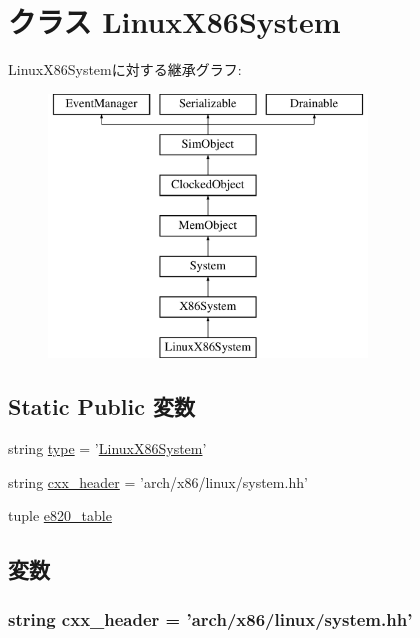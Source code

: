 \hypertarget{classX86System_1_1LinuxX86System}{
\section{クラス LinuxX86System}
\label{classX86System_1_1LinuxX86System}
}
LinuxX86Systemに対する継承グラフ:\begin{figure}[H]
\begin{center}
\leavevmode
\includegraphics[height=7cm]{classX86System_1_1LinuxX86System}
\end{center}
\end{figure}
\subsection*{Static Public 変数}
\begin{DoxyCompactItemize}
\item 
string \hyperlink{classX86System_1_1LinuxX86System_acce15679d830831b0bbe8ebc2a60b2ca}{type} = '\hyperlink{classX86System_1_1LinuxX86System}{LinuxX86System}'
\item 
string \hyperlink{classX86System_1_1LinuxX86System_a17da7064bc5c518791f0c891eff05fda}{cxx\_\-header} = 'arch/x86/linux/system.hh'
\item 
tuple \hyperlink{classX86System_1_1LinuxX86System_a9bba18742b9defc72dc847cfddf0f2d1}{e820\_\-table}
\end{DoxyCompactItemize}


\subsection{変数}
\hypertarget{classX86System_1_1LinuxX86System_a17da7064bc5c518791f0c891eff05fda}{
\subsubsection[{cxx\_\-header}]{\setlength{\rightskip}{0pt plus 5cm}string {\bf cxx\_\-header} = 'arch/x86/linux/system.hh'}}
\label{classX86System_1_1LinuxX86System_a17da7064bc5c518791f0c891eff05fda}



